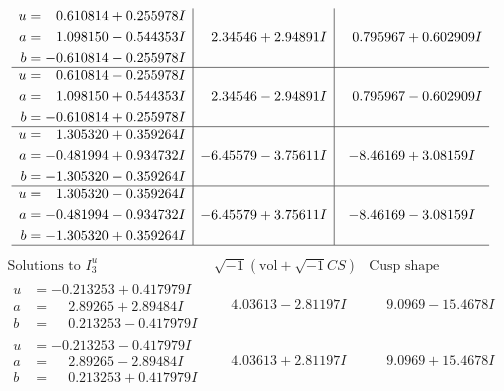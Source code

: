 \documentclass[1p]{elsarticle_modified}
\theoremstyle{definition}
\newcommand{\I}{\sqrt{-1}}
\begin{document}
$$\begin{array}{c|c|c}
\begin{aligned}
u &= \phantom{-}0.610814 + 0.255978 I \\
a &= \phantom{-}1.098150 - 0.544353 I \\
b &= -0.610814 - 0.255978 I\end{aligned}
 & \phantom{-}2.34546 + 2.94891 I & \phantom{-}0.795967 + 0.602909 I \\ \hline\begin{aligned}
u &= \phantom{-}0.610814 - 0.255978 I \\
a &= \phantom{-}1.098150 + 0.544353 I \\
b &= -0.610814 + 0.255978 I\end{aligned}
 & \phantom{-}2.34546 - 2.94891 I & \phantom{-}0.795967 - 0.602909 I \\ \hline\begin{aligned}
u &= \phantom{-}1.305320 + 0.359264 I \\
a &= -0.481994 + 0.934732 I \\
b &= -1.305320 - 0.359264 I\end{aligned}
 & -6.45579 - 3.75611 I & -8.46169 + 3.08159 I \\ \hline\begin{aligned}
u &= \phantom{-}1.305320 - 0.359264 I \\
a &= -0.481994 - 0.934732 I \\
b &= -1.305320 + 0.359264 I\end{aligned}
 & -6.45579 + 3.75611 I & -8.46169 - 3.08159 I\\
 \hline 
 \end{array}$$\newpage$$\begin{array}{c|c|c}  
\text{Solutions to }I^u_{3}& \I (\text{vol} + \sqrt{-1}CS) & \text{Cusp shape}\\
 \hline 
\begin{aligned}
u &= -0.213253 + 0.417979 I \\
a &= \phantom{-}2.89265 + 2.89484 I \\
b &= \phantom{-}0.213253 - 0.417979 I\end{aligned}
 & \phantom{-}4.03613 - 2.81197 I & \phantom{-}9.0969 - 15.4678 I \\ \hline\begin{aligned}
u &= -0.213253 - 0.417979 I \\
a &= \phantom{-}2.89265 - 2.89484 I \\
b &= \phantom{-}0.213253 + 0.417979 I\end{aligned}
 & \phantom{-}4.03613 + 2.81197 I & \phantom{-}9.0969 + 15.4678 I \\ \hline\begin{aligned}

\end{aligned}
\end{array}$$
\end{document}

